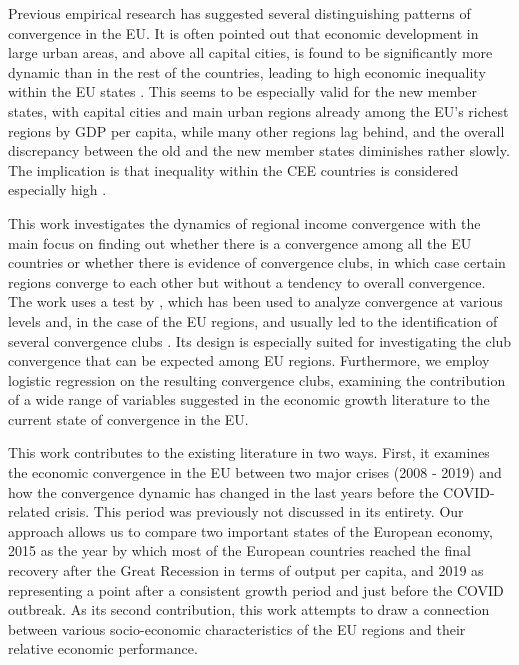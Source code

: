 \documentclass[11pt]{article}
\begin{document}
Previous empirical research has suggested several distinguishing patterns of convergence in the EU. It is often pointed out that economic development in large urban areas, and above all capital cities, is found to be significantly more dynamic than in the rest of the countries, leading to high economic inequality within the EU states \citep{geppert2008regional}. This seems to be especially valid for the new member states, with capital cities and main urban regions already among the EU's richest regions by GDP per capita, while many other regions lag behind, and the overall discrepancy between the old and the new member states diminishes rather slowly. The implication is that inequality within the CEE countries is considered especially high \citep{geppert2008regional,sme2012regional, smketkowski2013regional}.


This work investigates the dynamics of regional income convergence with the main focus on finding out whether there is a convergence among all the EU countries or whether there is evidence of convergence clubs, in which case certain regions converge to each other but without a tendency to overall convergence. The work uses a test by \citet{phillips2007transition}, which has been used to analyze convergence at various levels and, in the case of the EU regions, and usually led to the identification of several convergence clubs \citep{bartkowska2012regional, borsi2015evolution, von2017regional}. Its design is especially suited for investigating the club convergence that can be expected among EU regions. Furthermore, we employ logistic regression on the resulting convergence clubs, examining the contribution of a wide range of variables suggested in the economic growth literature to the current state of convergence in the EU.

This work contributes to the existing literature in two ways. First, it examines the economic convergence in the EU between two major crises (2008 - 2019) and how the convergence dynamic has changed in the last years before the COVID-related crisis. This period was previously not discussed in its entirety. Our approach allows us to compare two important states of the European economy, 2015 as the year by which most of the European countries reached the final recovery after the Great Recession in terms of output per capita, and 2019 as representing a point after a consistent growth period and just before the COVID outbreak. As its second contribution, this work attempts to draw a connection between various socio-economic characteristics of the EU regions and their relative economic performance.
\end{document}
